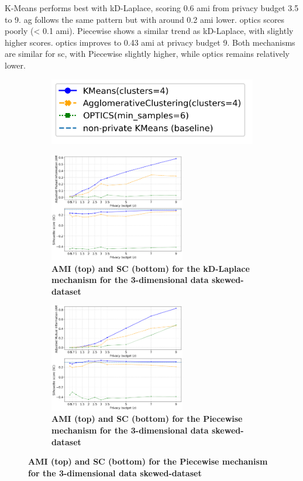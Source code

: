 K-Means performs best with kD-Laplace, scoring 0.6 \gls{ami} from privacy budget 3.5 to 9.
\gls{ag} follows the same pattern but with around 0.2 \gls{ami} lower.
\gls{optics} scores poorly (< 0.1 \gls{ami}).
Piecewise shows a similar trend as kD-Laplace, with slightly higher scores. \gls{optics} improves to 0.43 \gls{ami} at privacy budget 9.
Both mechanisms are similar for \gls{sc}, with Piecewise slightly higher, while \gls{optics} remains relatively lower.
\newpage
\begin{figure}[H]
      \centering
      \begin{subfigure}{0.3\textwidth}
            \includegraphics[width=\textwidth]{Results/kd-laplace/kd-Laplace/skewed-dataset/legend_3.png}
      \end{subfigure}
      \begin{subfigure}{1\textwidth}
            \caption{\textbf{AMI (top) and SC (bottom) for the kD-Laplace mechanism for the 3-dimensional data skewed-dataset}}
            \centering
            \includegraphics[width=0.65\textwidth]{Results/kd-laplace/kd-Laplace/skewed-dataset/ami-and-sc_3_dimensions.png}
            \centering
      \end{subfigure}
      \begin{subfigure}{1\textwidth}
            \caption{\textbf{AMI (top) and SC (bottom) for the Piecewise mechanism for the 3-dimensional data skewed-dataset}}
            \centering
            \includegraphics[width=0.65\textwidth]{Results/kd-laplace/piecewise/skewed-dataset/ami-and-sc_3_dimensions.png}

\end{subfigure}
\end{figure}
